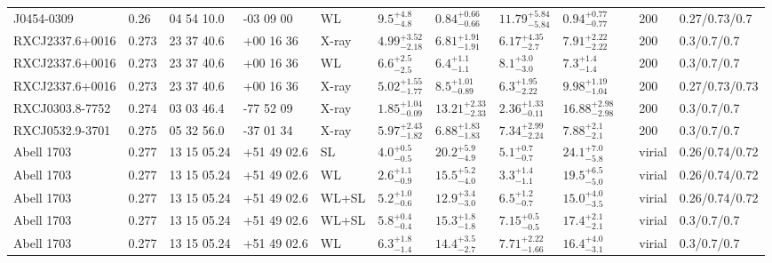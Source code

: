 \begin{landscape}
\begin{center}
{\begin{longtable}{llllllllllll}
J0454-0309 & 0.26 & 04 54 10.0 & -03 09 00 & WL & ${9.5}^{+4.8}_{-4.8}$ & ${0.84}^{+0.66}_{-0.66}$ & ${11.79}^{+5.84}_{-5.84}$ & ${0.94}^{+0.77}_{-0.77}$ & \citet{SC10.1} & 200 & 0.27/0.73/0.7 \\
RXCJ2337.6+0016 & 0.273 & 23 37 40.6 & +00 16 36 & X-ray & ${4.99}^{+3.52}_{-2.18}$ & ${6.81}^{+1.91}_{-1.91}$ & ${6.17}^{+4.35}_{-2.7}$ & ${7.91}^{+2.22}_{-2.22}$ & \citet{ET11.1} & 200 & 0.3/0.7/0.7 \\
RXCJ2337.6+0016 & 0.273 & 23 37 40.6 & +00 16 36 & WL & ${6.6}^{+2.5}_{-2.5}$ & ${6.4}^{+1.1}_{-1.1}$ & ${8.1}^{+3.0}_{-3.0}$ & ${7.3}^{+1.4}_{-1.4}$ & \citet{SE14.1} & 200 & 0.3/0.7/0.7 \\
RXCJ2337.6+0016 & 0.273 & 23 37 40.6 & +00 16 36 & X-ray & ${5.02}^{+1.55}_{-1.77}$ & ${8.5}^{+1.01}_{-0.89}$ & ${6.3}^{+1.95}_{-2.22}$ & ${9.98}^{+1.19}_{-1.04}$ & \citet{BA14.1} & 200 & 0.27/0.73/0.73 \\
RXCJ0303.8-7752 & 0.274 & 03 03 46.4 & -77 52 09 & X-ray & ${1.85}^{+1.04}_{-0.09}$ & ${13.21}^{+2.33}_{-2.33}$ & ${2.36}^{+1.33}_{-0.11}$ & ${16.88}^{+2.98}_{-2.98}$ & \citet{ET11.1} & 200 & 0.3/0.7/0.7 \\
RXCJ0532.9-3701 & 0.275 & 05 32 56.0 & -37 01 34 & X-ray & ${5.97}^{+2.43}_{-1.82}$ & ${6.88}^{+1.83}_{-1.83}$ & ${7.34}^{+2.99}_{-2.24}$ & ${7.88}^{+2.1}_{-2.1}$ & \citet{ET11.1} & 200 & 0.3/0.7/0.7 \\
Abell 1703 & 0.277 & 13 15 05.24 & +51 49 02.6 & SL & ${4.0}^{+0.5}_{-0.5}$ & ${20.2}^{+5.9}_{-4.9}$ & ${5.1}^{+0.7}_{-0.7}$ & ${24.1}^{+7.0}_{-5.8}$ & \citet{OG09.1} & virial & 0.26/0.74/0.72 \\
Abell 1703 & 0.277 & 13 15 05.24 & +51 49 02.6 & WL & ${2.6}^{+1.1}_{-0.9}$ & ${15.5}^{+5.2}_{-4.0}$ & ${3.3}^{+1.4}_{-1.1}$ & ${19.5}^{+6.5}_{-5.0}$ & \citet{OG09.1} & virial & 0.26/0.74/0.72 \\
Abell 1703 & 0.277 & 13 15 05.24 & +51 49 02.6 & WL+SL & ${5.2}^{+1.0}_{-0.6}$ & ${12.9}^{+3.4}_{-3.0}$ & ${6.5}^{+1.2}_{-0.7}$ & ${15.0}^{+4.0}_{-3.5}$ & \citet{OG09.1} & virial & 0.26/0.74/0.72 \\
Abell 1703 & 0.277 & 13 15 05.24 & +51 49 02.6 & WL+SL & ${5.8}^{+0.4}_{-0.4}$ & ${15.3}^{+1.8}_{-1.8}$ & ${7.15}^{+0.5}_{-0.5}$ & ${17.4}^{+2.1}_{-2.1}$ & \citet{ZI10.1} & virial & 0.3/0.7/0.7 \\
Abell 1703 & 0.277 & 13 15 05.24 & +51 49 02.6 & WL & ${6.3}^{+1.8}_{-1.4}$ & ${14.4}^{+3.5}_{-2.7}$ & ${7.71}^{+2.22}_{-1.66}$ & ${16.4}^{+4.0}_{-3.1}$ & \citet{ZI10.1} & virial & 0.3/0.7/0.7 \\

\end{longtable}}
\end{center}
\end{landscape}
